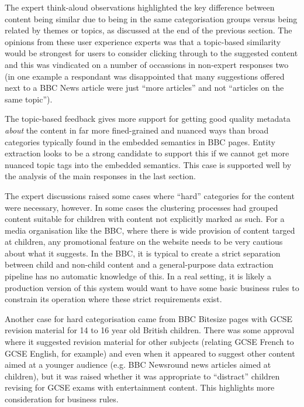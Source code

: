 The expert think-aloud observations highlighted the key difference
between content being similar due to being in the same categorisation
groups versus being related by themes or topics, as discussed at the
end of the previous section. The opinions from these user experience
experts was that a topic-based similarity would be strongest for users
to consider clicking through to the suggested content and this was
vindicated on a number of occassions in non-expert responses two
(in one example a respondant was disappointed that many suggestions
offered next to a BBC News article were just ``more articles'' and
not ``articles on the same topic'').

The topic-based feedback gives more support for getting good quality
metadata \emph{about} the content in far more fined-grained and
nuanced ways than broad categories typically found in the embedded
semantics in BBC pages. Entity extraction looks to be a strong
candidate to support this if we cannot get more nuanced topic tags
into the embedded semantics. This case is supported well by the
analysis of the main responses in the last section.

The expert discussions raised some cases where ``hard'' categories
for the content were necessary, however. In some cases the clustering
processes had grouped content suitable for children with content not
explicitly marked as such. For a media organisation like the BBC, where
there is wide provision of content targed at children, any
promotional feature on the website needs to be very cautious about
what it suggests. In the BBC, it is typical to create a strict
separation between child and non-child content and a general-purpose
data extraction pipeline has no automatic knowledge of this. In a
real setting, it is likely a production version of this system would
want to have some basic business rules to constrain its operation
where these strict requirements exist.

Another case for hard categorisation came from BBC Bitesize pages
with GCSE revision material for 14 to 16 year old British children.
There was some approval where it suggested revision material
for other subjects (relating GCSE French to GCSE English, for
example) and even when it appeared to suggest other content aimed
at a younger audience (e.g. BBC Newsround news articles aimed at children),
but it was raised whether it was appropriate to ``distract'' children
revising for GCSE exams with entertainment content. This highlights
more consideration for business rules.

